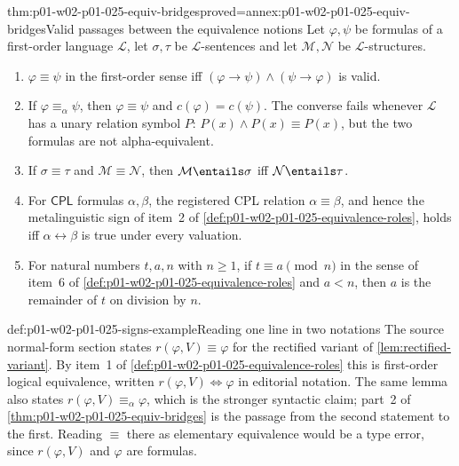\begin{hblemma}{thm:p01-w02-p01-025-equiv-bridges}{proved=annex:p01-w02-p01-025-equiv-bridges}{Valid passages between the equivalence notions}
Let \(\varphi,\psi\) be formulas of a first-order language \(\mathcal L\),
let \(\sigma,\tau\) be \(\mathcal L\)-sentences and let \(\mathcal M,\mathcal
N\) be \(\mathcal L\)-structures.
\begin{enumerate}
  \item \(\varphi\equiv\psi\) in the first-order sense iff
  \((\varphi\to\psi)\land(\psi\to\varphi)\) is valid.
  \item If \(\varphi\equiv_\alpha\psi\), then \(\varphi\equiv\psi\) and
  \(c(\varphi)=c(\psi)\).  The converse fails whenever \(\mathcal L\) has a
  unary relation symbol \(P\): \(P(x)\land P(x)\equiv P(x)\), but the two
  formulas are not alpha-equivalent.
  \item If \(\sigma\equiv\tau\) and \(\mathcal M\equiv\mathcal N\), then
  \(\mathcal M\entails\sigma\) iff \(\mathcal N\entails\tau\).
  \item For \(\mathsf{CPL}\) formulas \(\alpha,\beta\), the registered CPL
  relation \(\alpha\equiv\beta\), and hence the metalinguistic sign of
  item~2 of \cref{def:p01-w02-p01-025-equivalence-roles}, holds iff
  \(\alpha\leftrightarrow\beta\) is true under every valuation.
  \item For natural numbers \(t,a,n\) with \(n\geq1\), if
  \(t\equiv a\pmod n\) in the sense of item~6 of
  \cref{def:p01-w02-p01-025-equivalence-roles} and \(a<n\), then \(a\) is
  the remainder of \(t\) on division by \(n\).
\end{enumerate}
\end{hblemma}

\begin{hbexample}{def:p01-w02-p01-025-signs-example}{Reading one line in two notations}
The source normal-form section states \(r(\varphi,V)\equiv\varphi\) for the
rectified variant of \cref{lem:rectified-variant}.  By item~1 of
\cref{def:p01-w02-p01-025-equivalence-roles} this is first-order logical
equivalence, written \(r(\varphi,V)\Leftrightarrow\varphi\) in editorial
notation.  The same lemma also states \(r(\varphi,V)\equiv_\alpha\varphi\),
which is the stronger syntactic claim; part~2 of
\cref{thm:p01-w02-p01-025-equiv-bridges} is the passage from the second
statement to the first.  Reading \(\equiv\) there as elementary equivalence
would be a type error, since \(r(\varphi,V)\) and \(\varphi\) are formulas.
\end{hbexample}
